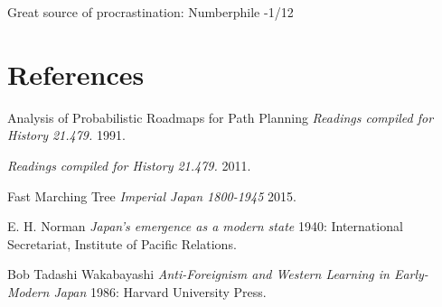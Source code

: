\documentclass[a4paper]{article}
\begin{document}
Great source of procrastination: Numberphile
-1/12






\section{References}

\begin{thebibliography}{1}

 Analysis of Probabilistic Roadmaps for Path Planning {\em Readings compiled for History
21.479.}  1991.


 {\em Readings compiled for History
21.479.} 2011.

 Fast Marching Tree {\em Imperial Japan 1800-1945} 2015.

 E. H. Norman {\em Japan's emergence as a modern
state} 1940: International Secretariat, Institute of Pacific
Relations.

 Bob Tadashi Wakabayashi {\em Anti-Foreignism and Western
Learning in Early-Modern Japan} 1986: Harvard University Press.

\end{thebibliography}






\end{document}
